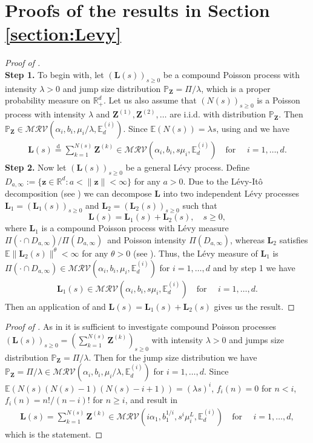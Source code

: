 \documentclass[aos]{imsart}
\numberwithin{equation}{section}
\theoremstyle{plain} %
\theoremstyle{remark}
\newcommand{\beao}{\begin{eqnarray*}}
\newcommand{\eeao}{\end{eqnarray*}\noindent}
\newcommand{\E}{\mathbb{E}}
\renewcommand\P{\mathbb{P}}
\newcommand{\R}{\mathbb{R}}
\def\MRV{\mathcal{MRV}}
\def\bZ{\boldsymbol Z}
\def\bL{\boldsymbol L}
\def\bz{\boldsymbol z}
\newcommand{\eqd}{\stackrel{\mathrm{d}}{=}}
\begin{document}
\section{Proofs of the results in Section \ref{section:Levy}} \label{sec:proofLevy}

\begin{proof}[Proof of ]  \mbox{}\\
\textbf{Step 1.} To begin with, let $(\bL(s))_{s\geq 0}$ be a compound Poisson process with intensity $\lambda>0$ and jump size distribution $\P_{\bZ}=\Pi/\lambda$, which is a proper probability measure on $\R^d_+$. Let us also assume that $(N(s))_{s\geq 0}$ is a Poisson process with intensity $\lambda$ and $\bZ^{(1)},\bZ^{(2)},\ldots$ are  i.i.d.  with distribution $\P_{\bZ}$.
Then $\P_{\bZ}\in\MRV(\alpha_i,b_i,\mu_i/\lambda,\E_d^{(i)})$.
Since $\E(N(s))=\lambda s$, using  and  we have
\beao
  \bL(s)\eqd\sum_{k=1}^{N(s)}\bZ^{(k)}\in\MRV(\alpha_i,b_i,s\mu_i,\E_d^{(i)}) \quad  \text {for } \quad i=1,\ldots,d.
\eeao
\textbf{Step 2.} Now let $(\bL(s))_{s\geq 0}$ be a general L\'evy process.
Define $D_{a,\infty}:=\{\bz\in\R^d:a<\|\bz\|<\infty\}$ for any $a>0$.
Due to the L\'evy-Itô decomposition (see \cite[Theorem 19.2 and Theorem 19.3]{sato:1991}) we can decompose $\bL$ into two independent L\'evy processes $\bL_1=(\bL_1(s))_{s\geq 0}$ and $\bL_2=(\bL_2(s))_{s\geq 0}$ such that
$$\bL(s)=\bL_1(s)+\bL_2(s), \quad s\geq 0,$$
where $\bL_1$ is a compound Poisson process with L\'evy measure $\Pi(\cdot\cap D_{a,\infty})/\Pi(D_{a,\infty})$\ and Poisson intensity
$\Pi(D_{a,\infty})$, whereas  $\bL_2$ satisfies  $\E\|\bL_2(s)\|^\theta<\infty$ for any $\theta>0$ (see \cite[Lemma 2.2 and proof of Theorem 2.3]{lindskog:2004thesis}). Thus, the L\'evy measure of $\bL_1$ is $\Pi(\cdot\cap D_{a,\infty})\in \MRV(\alpha_i,b_i,\mu_i,\E_d^{(i)})$ for $i=1,\ldots,d$
and by step 1 we have
\beao
  \bL_1(s)\in\MRV(\alpha_i,b_i,s\mu_i,\E_d^{(i)}) \quad  \text {for } \quad i=1,\ldots,d.
\eeao
Then an application of  and $\bL(s)=\bL_1(s)+\bL_2(s)$ gives us the result.
\end{proof}

\begin{proof}[Proof of ]
As in  it is sufficient to investigate compound Poisson processes $(\bL(s))_{s\geq 0}=(\sum_{k=1}^{N(s)}\bZ^{(k)})_{s\geq 0}$  with intensity $\lambda>0$ and jumps size distribution $\P_{\bZ}=\Pi/\lambda$. Then
for the jump size distribution we have $\P_{\bZ}=\Pi/\lambda\in\MRV(\alpha_i,b_i,\mu_i/\lambda,\E_d^{(i)})$ for $i=1,\ldots,d$.
Since $\E(N(s)(N(s)-1)(N(s)-i+1))=(\lambda s)^{i}$, $f_i(n)=0$ for $n<i$, $f_i(n)=n!/(n-i)!$ for $n\geq i$,   and  result in
\begin{eqnarray*}
    \bL(s)=\sum_{k=1}^{N(s)}\bZ^{(k)}\in \MRV(i\alpha_1,b_1^{1/i},s^{i}\mu_i^L,\E_d^{(i)})
    \quad \text {for } \quad i=1,\ldots,  d,
\end{eqnarray*}
which is the statement.
\end{proof}
\end{document}
